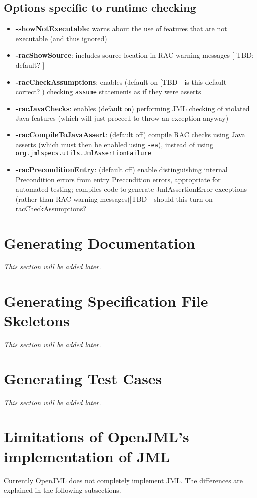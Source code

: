\subsection{Options specific to runtime checking}
\begin{itemize}[noitemsep,nolistsep]
\item \textbf{-showNotExecutable}: warns about the use of features that are not executable (and thus ignored)
\item \textbf{-racShowSource}: includes source location in RAC warning messages [ TBD: default? ]
\item \textbf{-racCheckAssumptions}: enables (default on [TBD - is this default correct?]) checking \texttt{assume} statements as if they were asserts
\item \textbf{-racJavaChecks}: enables (default on) performing JML checking of violated Java features (which will just proceed to throw an exception anyway)
\item \textbf{-racCompileToJavaAssert}: (default off) compile RAC checks using Java asserts (which must then be enabled using \texttt{-ea}), instead of using \texttt{org.jmlspecs.utils.JmlAssertionFailure}
\item \textbf{-racPreconditionEntry}: (default off) enable distinguishing internal Precondition errors from entry Precondition errors, appropriate for automated testing; compiles code to generate JmlAssertionError exceptions
(rather than RAC warning messages)[TBD - should this turn on -racCheckAssumptions?] 
\end{itemize}

\section{Generating Documentation}
\textit{This section will be added later.} %

\section{Generating Specification File Skeletons}
\textit{This section will be added later.} %

\section{Generating Test Cases}
\textit{This section will be added later.} %

\section{Limitations of OpenJML's implementation of JML}
Currently OpenJML does not completely implement JML. The differences are explained in the following subsections.

